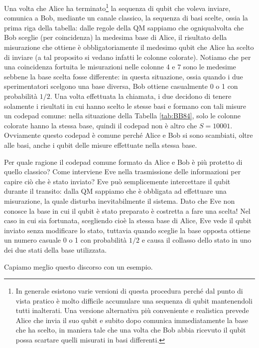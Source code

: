 \begin{esempio}
\noindent Una volta che Alice ha terminato\footnote{In generale esistono varie versioni di questa procedura perché dal punto di vista pratico è molto difficile accumulare una sequenza di qubit mantenendoli tutti inalterati. Una versione alternativa più conveniente e realistica prevede Alice che invia il suo qubit e subito dopo comunica immediatamente la base che ha scelto, in maniera tale che una volta che Bob abbia ricevuto il qubit possa scartare quelli misurati in basi differenti.} la sequenza di qubit che voleva inviare, comunica a Bob, mediante un canale classico, la sequenza di basi scelte, ossia la prima riga della tabella: dalle regole della QM sappiamo che ogniqualvolta che Bob sceglie (per coincidenza) la medesima base di Alice, il risultato della misurazione che ottiene è obbligatoriamente il medesimo qubit che Alice ha scelto di inviare (a tal proposito si vedano infatti le colonne colorate). Notiamo che per una coincidenza fortuita le misurazioni nelle colonne 4 e 7 sono le medesime sebbene la base scelta fosse differente: in questa situazione, ossia quando i due sperimentatori scelgono una base diversa, Bob ottiene casualmente 0 o 1 con probabilità $1/2$. Una volta effettuata la chiamata, i due decidono di tenere solamente i risultati in cui hanno scelto le stesse basi e formano con tali misure un codepad comune: nella situazione della Tabella \ref{tab:BB84}, solo le colonne colorate hanno la stessa base, quindi il codepad non è altro che $S = 10001$. Ovviamente questo codepad è comune perché Alice e Bob si sono scambiati, oltre alle basi, anche i qubit delle misure effettuate nella stessa base.
\end{esempio}

\noindent Per quale ragione il codepad comune formato da Alice e Bob è più protetto di quello classico? Come interviene Eve nella trasmissione delle informazioni per capire ciò che è stato inviato? Eve può semplicemente intercettare il qubit durante il transito: dalla QM sappiamo che è obbligata ad effettuare una misurazione, la quale disturba inevitabilmente il sistema. Dato che Eve non conosce la base in cui il qubit è stato preparato è costretta a fare una scelta! Nel caso in cui sia fortunata, scegliendo cioè la stessa base di Alice, Eve vede il qubit inviato senza modificare lo stato, tuttavia quando sceglie la base opposta ottiene un numero casuale 0 o 1 con probabilità $1/2$ e causa il collasso dello stato in uno dei due stati della base utilizzata. 

\noindent Capiamo meglio questo discorso con un esempio.


